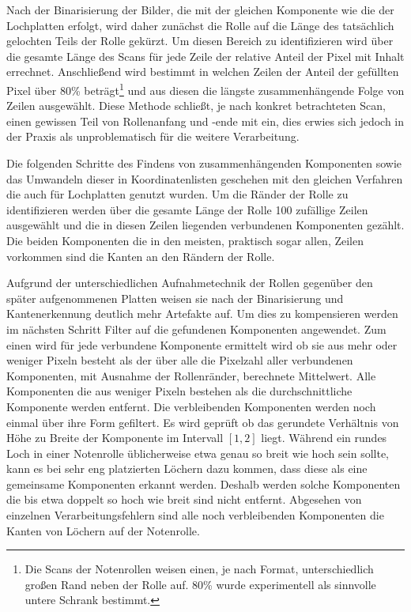 Nach der Binarisierung der Bilder, die mit der gleichen Komponente wie die der Lochplatten erfolgt, wird daher zunächst die Rolle auf die Länge des tatsächlich gelochten Teils der Rolle gekürzt.
Um diesen Bereich zu identifizieren wird über die gesamte Länge des Scans für jede Zeile der relative Anteil der Pixel mit Inhalt errechnet.
Anschließend wird bestimmt in welchen Zeilen der Anteil der gefüllten Pixel über 80\% beträgt\footnote{Die Scans der Notenrollen weisen einen, je nach Format, unterschiedlich großen Rand neben der Rolle auf. 80\% wurde experimentell als sinnvolle untere Schrank bestimmt.} und aus diesen die längste zusammenhängende Folge von Zeilen ausgewählt.
Diese Methode schließt, je nach konkret betrachteten Scan, einen gewissen Teil von Rollenanfang und -ende mit ein, dies erwies sich jedoch in der Praxis als unproblematisch für die weitere Verarbeitung.

Die folgenden Schritte des Findens von zusammenhängenden Komponenten sowie das Umwandeln dieser in Koordinatenlisten geschehen mit den gleichen Verfahren die auch für Lochplatten genutzt wurden.
Um die Ränder der Rolle zu identifizieren werden über die gesamte Länge der Rolle 100 zufällige Zeilen ausgewählt und die in diesen Zeilen liegenden verbundenen Komponenten gezählt.
Die beiden Komponenten die in den meisten, praktisch sogar allen, Zeilen vorkommen sind die Kanten an den Rändern der Rolle.

Aufgrund der unterschiedlichen Aufnahmetechnik der Rollen gegenüber den später aufgenommenen Platten weisen sie nach der Binarisierung und Kantenerkennung deutlich mehr Artefakte auf.
Um dies zu kompensieren werden im nächsten Schritt Filter auf die gefundenen Komponenten angewendet.
Zum einen wird für jede verbundene Komponente ermittelt wird ob sie aus mehr oder weniger Pixeln besteht als der über alle die Pixelzahl aller verbundenen Komponenten, mit Ausnahme der Rollenränder, berechnete Mittelwert.
Alle Komponenten die aus weniger Pixeln bestehen als die durchschnittliche Komponente werden entfernt.
Die verbleibenden Komponenten werden noch einmal über ihre Form gefiltert.
Es wird geprüft ob das gerundete Verhältnis von Höhe zu Breite der Komponente im Intervall $[1,2]$ liegt.
Während ein rundes Loch in einer Notenrolle üblicherweise etwa genau so breit wie hoch sein sollte, kann es bei sehr eng platzierten Löchern dazu kommen, dass diese als eine gemeinsame Komponenten erkannt werden.
Deshalb werden solche Komponenten die bis etwa doppelt so hoch wie breit sind nicht entfernt.
Abgesehen von einzelnen Verarbeitungsfehlern sind alle noch verbleibenden Komponenten die Kanten von Löchern auf der Notenrolle.

